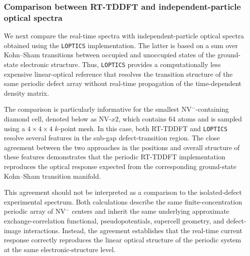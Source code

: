 
\subsubsection{Comparison between RT-TDDFT and independent-particle optical spectra}

We next compare the real-time spectra with independent-particle optical
spectra obtained using the \texttt{LOPTICS} implementation.  The latter
is based on a sum over Kohn--Sham transitions between occupied and
unoccupied states of the ground-state electronic structure.  Thus,
\texttt{LOPTICS} provides a computationally less expensive
linear-optical reference that resolves the transition structure of the
same periodic defect array without real-time propagation of the
time-dependent density matrix.

The comparison is particularly informative for the smallest
NV$^-$-containing diamond cell, denoted below as NV-$x2$, which contains
64 atoms and is sampled using a $4 \times 4 \times 4$ $k$-point mesh.
In this case, both RT-TDDFT and \texttt{LOPTICS} resolve several
features in the sub-gap defect-transition region.  The close agreement
between the two approaches in the positions and overall structure of
these features demonstrates that the periodic RT-TDDFT implementation
reproduces the optical response expected from the corresponding
ground-state Kohn--Sham transition manifold.

This agreement should not be interpreted as a comparison to the
isolated-defect experimental spectrum.  Both calculations describe the
same finite-concentration periodic array of NV$^-$ centers and inherit
the same underlying approximate exchange-correlation functional,
pseudopotentials, supercell geometry, and defect-image interactions.
Instead, the agreement establishes that the real-time current response
correctly reproduces the linear optical structure of the periodic
system at the same electronic-structure level.


